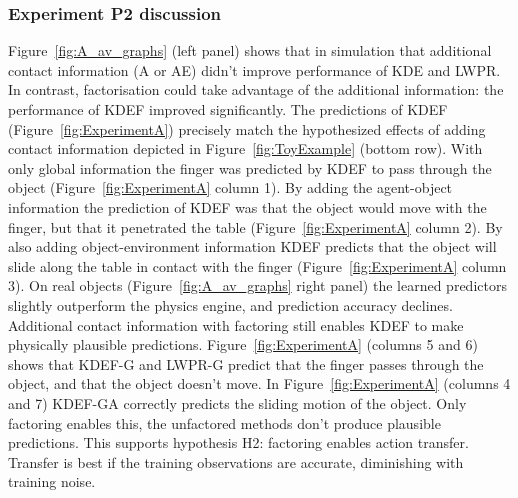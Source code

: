 \subsubsection{Experiment P2 discussion} 
Figure~\ref{fig:A_av_graphs} (left panel) shows that in simulation that additional contact information (A or AE) didn't improve performance of KDE and LWPR. In contrast, factorisation could take advantage of the additional information: the performance of KDEF improved significantly. The predictions of KDEF (Figure~\ref{fig:ExperimentA}) precisely match the hypothesized
effects of adding contact information depicted in Figure~\ref{fig:ToyExample} (bottom row). With only global information the finger was predicted by KDEF to pass through the object (Figure~\ref{fig:ExperimentA} column 1). By adding the agent-object information the prediction of KDEF was that the object would move with the finger, but that it penetrated the table (Figure~\ref{fig:ExperimentA} column 2). By also adding object-environment information KDEF predicts that the object will slide along the table in contact with the finger (Figure~\ref{fig:ExperimentA} column 3). On real objects (Figure~\ref{fig:A_av_graphs} right panel) the learned predictors slightly outperform the physics engine, and prediction accuracy declines. Additional contact information with factoring still enables KDEF to make physically plausible predictions. Figure~\ref{fig:ExperimentA} (columns 5 and 6) shows that KDEF-G and LWPR-G predict that the finger passes through the object, and that the object doesn't move. In Figure~\ref{fig:ExperimentA} (columns 4 and 7) KDEF-GA correctly predicts the sliding motion of the object. Only factoring enables this, the unfactored methods don't produce plausible predictions. This supports hypothesis H2: factoring enables action transfer. Transfer is best if the training observations are accurate, diminishing with training noise. 

